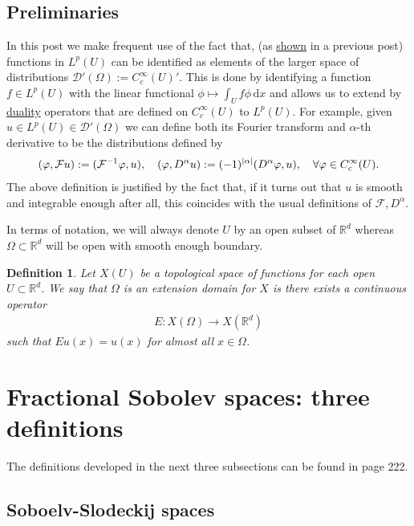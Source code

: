 \documentclass[
    a4paper,
    DIV=14,
    abstract=true,
    numbers=noenddot
]
{scrartcl}
\newtheorem{definition}[theorem]{Definition}
\theoremstyle{definition}
\renewcommand{\d}{\,\mathrm{d}}\newcommand{\dx}{\,\mathrm{d}x}
\newcommand{\R}{\mathbb{R}}
\newcommand{\Dd}{\mathcal{D}}
\newcommand{\Ff}{\mathcal{F}}
\begin{document}
\subsection{Preliminaries}
In this post we make frequent use of the fact that, (as \href{https://nowheredifferentiable.com/2023-07-12-PDEs-3-Sobolev_spaces/#:~:text=we%20would%20like%20to%20see%20what%20some%20of%20them%20look%20like.}{shown} in a previous post) functions in $L^p(U)$ can be identified as elements of the larger space of distributions $\Dd '(\Omega ):= C_c^\infty(U)'$. This is done by identifying a function $f \in L^p(U)$ with the linear functional $\phi \mapsto \int_U f\phi \d x$ and allows us to extend by \href{https://nowheredifferentiable.com/2023-01-29-PDE-1-Fourier/#:~:text=is%20called%20the-,duality,-method%20and%20appears}{duality} operators that are defined on $C_c^\infty(U)$ to $L^p(U)$. For example, given $u \in L^p(U) \in \Dd'(\Omega )$ we can define both its Fourier transform and  $\alpha$-th derivative to be the distributions defined by
\begin{align*}
  (\varphi ,\Ff u):=(\Ff^{-1}\varphi ,u),\quad (\varphi ,D^\alpha u):=(-1)^{\abs{\alpha}}(D^\alpha \varphi ,u), \quad \forall \varphi \in C_c^\infty(U).
\end{align*}
The above definition is justified by the fact that, if it turns out that $u$ is smooth and integrable enough after all, this coincides with the usual definitions of $\Ff , D^\alpha$.

In terms of notation, we will always denote $U$ by an open subset of $\R^d$  whereas $\Omega \subset \R^d $ will be open with smooth enough boundary.
\begin{definition}
  Let $X(U)$ be a topological space of functions for each open $U \subset \R^d$.
  We say that $\Omega $ is an extension domain for $X$  is there exists a continuous operator
  \begin{align*}
    E: X(\Omega ) \to X(\R^d)
  \end{align*}
  such that  $Eu(x)=u(x)$  for almost all $x \in \Omega $.
\end{definition}



\section{Fractional Sobolev spaces: three definitions}
The definitions developed in the next three subsections can be found in \cite{agranovich2015sobolev} page 222.
\subsection{Soboelv-Slodeckij spaces}
\end{document}
